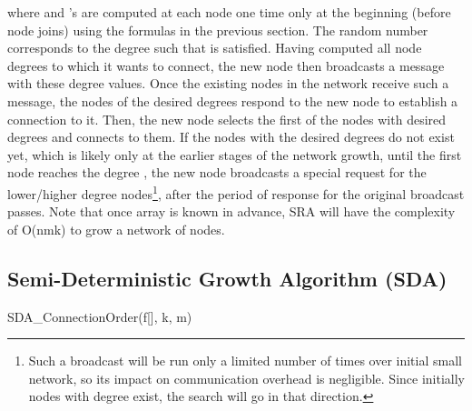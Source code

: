 \documentclass[10pt,journal,cspaper,compsoc]{IEEEtran}
\begin{document}
where  and 's are computed at each node one time only at the beginning (before node joins) using the  formulas in the previous section. The random number  corresponds to the degree  such that  is satisfied. Having computed all  node degrees to which it wants to connect, the new node then broadcasts a message with these degree values. Once the existing nodes in the network receive such a message, the nodes of the desired degrees respond to the new node to establish a connection to it. Then, the new node selects the first  of the nodes with desired degrees and connects to them. If the nodes with the desired degrees do not exist yet, which is likely only at the earlier stages of the network growth, until the first node reaches the degree , the new node broadcasts a special request for the lower/higher degree nodes\footnote{Such a broadcast will be run only a limited number of times over initial small network, so its impact on communication overhead is negligible. Since initially nodes with degree  exist, the search will go in that direction.}, after the period of response for the original broadcast passes. Note that once  array is known in advance, SRA will have the complexity of O(nmk) to grow a network of  nodes. 

\subsection{Semi-Deterministic Growth Algorithm (SDA)}

\begin{algorithm}
    \caption{SDA\_ConnectionOrder(f[], k, m)}
    \label{alg1}
    \begin{algorithmic}[1]
    \ENDFOR
  		\ENDIF
  		\ENDIF
  		\ENDFOR
  		\ENDFOR
  		\ENDFOR
  		\ENDFOR
    \end{algorithmic}
\end{algorithm}
\end{document}
